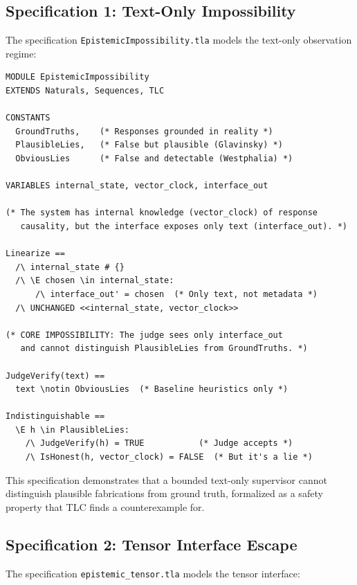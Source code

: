 \documentclass[11pt]{article}
\begin{document}
\subsection{Specification 1: Text-Only Impossibility}

The specification \texttt{EpistemicImpossibility.tla} models the text-only observation regime:

\begin{verbatim}
MODULE EpistemicImpossibility
EXTENDS Naturals, Sequences, TLC

CONSTANTS
  GroundTruths,    (* Responses grounded in reality *)
  PlausibleLies,   (* False but plausible (Glavinsky) *)
  ObviousLies      (* False and detectable (Westphalia) *)

VARIABLES internal_state, vector_clock, interface_out

(* The system has internal knowledge (vector_clock) of response
   causality, but the interface exposes only text (interface_out). *)

Linearize ==
  /\ internal_state # {}
  /\ \E chosen \in internal_state:
      /\ interface_out' = chosen  (* Only text, not metadata *)
  /\ UNCHANGED <<internal_state, vector_clock>>

(* CORE IMPOSSIBILITY: The judge sees only interface_out
   and cannot distinguish PlausibleLies from GroundTruths. *)

JudgeVerify(text) ==
  text \notin ObviousLies  (* Baseline heuristics only *)

Indistinguishable ==
  \E h \in PlausibleLies:
    /\ JudgeVerify(h) = TRUE           (* Judge accepts *)
    /\ IsHonest(h, vector_clock) = FALSE  (* But it's a lie *)
\end{verbatim}

This specification demonstrates that a bounded text-only supervisor cannot distinguish plausible fabrications from ground truth, formalized as a safety property that TLC finds a counterexample for.

\subsection{Specification 2: Tensor Interface Escape}

The specification \texttt{epistemic\_tensor.tla} models the tensor interface:
\end{document}
